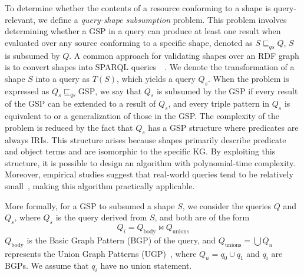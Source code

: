 To determine whether the contents of a resource conforming to a shape is query-relevant, we define a \emph{query-shape subsumption} problem.
This problem involves determining whether a GSP in a query can produce at least one result when evaluated over any source conforming to a specific shape, denoted as $S \sqsubseteq_{qs} Q$, $S$ is subsumed by $Q$.
A common approach for validating shapes over an RDF graph is to convert shapes into SPARQL queries~~\cite{labragayo2017validatingdescribinglinkeddata, Corman2019, Prestamo2023, spapeExpressionConvert}.
We denote the transformation of a shape $S$ into a query as $T(S)$, which yields a query $Q_s$.
When the problem is expressed as $Q_s \sqsubseteq_{qs} \text{GSP}$, we say that $Q_s$ is subsumed by the GSP if every result of the GSP can be extended to a result of $Q_s$, and every triple pattern in $Q_s$ is equivalent to or a generalization of those in the GSP.
The complexity of the problem is reduced by the fact that $Q_s$ has a GSP structure where predicates are always IRIs.
This structure arises because shapes primarily describe predicate and object terms and are isomorphic to the specific KG.
By exploiting this structure, it is possible to design an algorithm with polynomial-time complexity.
Moreover, empirical studies suggest that real-world queries tend to be relatively small~\cite{Doan2012, Bonifati2019}, making this algorithm practically applicable.

More formally, for a GSP to subsumed a shape $S$, we consider the queries $Q$ and $Q_s$, where $Q_s$ is the query derived from $S$, and both are of the form 
$$
Q_i = Q_{\text{body}} \bowtie Q_{\text{unions}}
$$
$Q_{\text{body}}$ is the Basic Graph Pattern (BGP) of the query, and $Q_{\text{unions}} = \bigcup Q_u$ represents the Union Graph Patterns (UGP)~\cite{w3SPARQLQuery}, where $Q_u = q_0 \cup q_1$ and $q_i$ are BGPs.
We assume that $q_i$ have no union statement.



